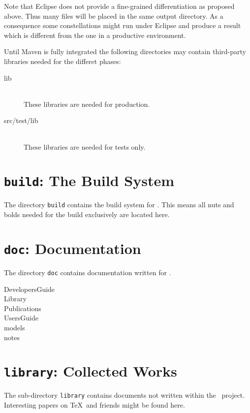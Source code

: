 Note that Eclipse does not provide a fine-grained differentiation as
proposed above. Thus many files will be placed in the same output
directory. As a consequence some constellations might run under
Eclipse and produce a result which is different from the one in a
productive environment.

Until Maven is fully integrated the following directories may contain
third-party libraries needed for the differet phases:



\begin{description}
\item[lib] \ \\
  These libraries are needed for production.
\item[src/test/lib] \ \\
  These libraries are needed for tests only.
\end{description}


\section{\texttt{build}: The Build System}

The directory \texttt{build} contains the build system for \ExTeX.
This means all nuts and bolds needed for the build exclusively are
located here.


\section{\texttt{doc}: Documentation}

The directory \texttt{doc} contains documentation written for \ExTeX.

\begin{description}
\item[DevelopersGuide] 
\item[Library] 
\item[Publications] 
\item[UsersGuide] 
\item[models] 
\item[notes] 
\end{description}


\section{\texttt{library}: Collected Works}

The sub-directory \texttt{library} contains documents not written
within the \ExTeX\ project. Interesting papers on \TeX\ and friends
might be found here.



